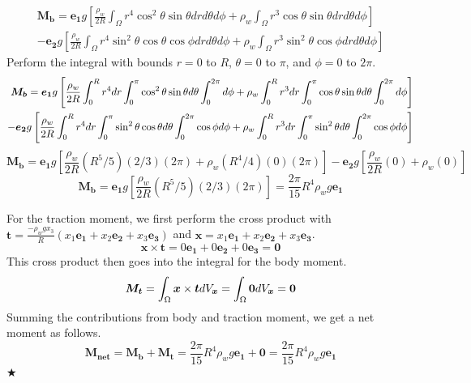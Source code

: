 \documentclass[preprint,12pt,authoryear]{elsarticle}
\begin{document}
\begin{equation}
\begin{split}
    \bm{M_b} = \bm{e_1}g \left[ \frac{\rho_w}{2R}\int_{\Omega}r^4\cos^2{\theta} \sin{\theta}drd\theta d\phi + \rho_w \int_{\Omega}r^3\cos{\theta}\sin{\theta}drd\theta d\phi \right] \\
    - \bm{e_2}g \left[ \frac{\rho_w}{2R}\int_{\Omega} r^4 \sin^2{\theta}\cos{\theta}\cos{\phi}drd\theta d\phi + \rho_w\int_{\Omega} r^3\sin^2{\theta}\cos{\phi}drd\theta d\phi \right]
\end{split}
\end{equation}
Perform the integral with bounds $r=0$ to $R$, $\theta=0$ to $\pi$, and $\phi = 0$ to $2\pi$.
\begin{equation}
\begin{split}
    \bm{M_b} = \bm{e_1}g \left[ \frac{\rho_w}{2R}\int_{0}^{R}r^4 dr \int_{0}^{\pi}\cos^2{\theta} \sin{\theta} \space d\theta \int_{0}^{2\pi}d\phi + \rho_w \int_{0}^{R}r^3dr \int_{0}^{\pi}\cos{\theta}\sin{\theta} \space d\theta \int_{0}^{2\pi}d\phi \right] \\
    - \bm{e_2}g \left[ \frac{\rho_w}{2R}\int_{0}^{R}r^4dr \int_{0}^{\pi}\sin^2{\theta}\cos{\theta} \space d\theta \int_{0}^{2\pi}\cos{\phi}\space d\phi + \rho_w\int_{0}^{R}r^3 dr\int_{0}^{\pi}\sin^2{\theta} \space d\theta \int_{0}^{2\pi}\cos{\phi} \space d\phi \right]
\end{split}
\end{equation}
\begin{equation}
    \bm{M_b} = \bm{e_1}g \left[ \frac{\rho_w}{2R} (R^5/5)(2/3)(2\pi) + \rho_w (R^4/4)(0)(2\pi) \right] - \bm{e_2}g \left[ \frac{\rho_w}{2R}(0) + \rho_w (0) \right]
\end{equation}
\begin{equation}
    \bm{M_b} = \bm{e_1}g \left[ \frac{\rho_w}{2R} (R^5/5)(2/3)(2\pi)\right] = \frac{2\pi}{15}R^4\rho_w g \bm{e_1}
\end{equation}

For the traction moment, we first perform the cross product with $\bm{t} = \frac{-\rho_w g x_3}{R}(x_1\bm{e_1} + x_2\bm{e_2} + x_3\bm{e_3})$ and $\bm{x} = x_1 \bm{e_1} + x_2 \bm{e_2} + x_3 \bm{e_3}$.
\begin{equation}
    \bm{x} \times \bm{t} = 0 \bm{e_1} + 0 \bm{e_2} + 0 \bm{e_3} = \bm{0}
\end{equation}
This cross product then goes into the integral for the body moment.
\begin{equation}
    \bm{M_t} = \int_{\Omega}\bm{x} \times \bm{t} \space dV_{\bm{x}} = \int_{\Omega} \bm{0} \space dV_{\bm{x}} = \bm{0}
\end{equation}
Summing the contributions from body and traction moment, we get a net moment as follows.
\begin{equation}
    \bm{M_{net}} = \bm{M_{b}} + \bm{M_{t}} = \frac{2\pi}{15}R^4\rho_w g \bm{e_1} + \bm{0} = \frac{2\pi}{15}R^4\rho_w g \bm{e_1}
\end{equation}
\hspace*{\fill} $\bigstar$
\medskip
\end{document}
